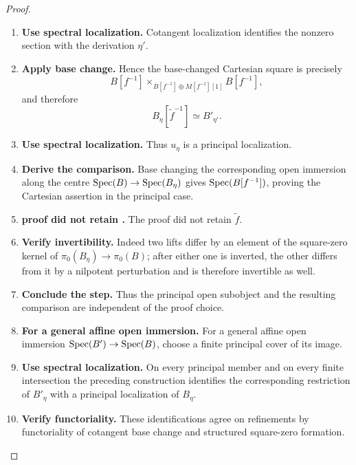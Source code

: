 \begin{proof}
\begin{enumerate}[label=\textup{(\arabic*)}]
    \item \textbf{Use spectral localization.}
    Cotangent localization identifies the nonzero section with the derivation \(\eta'\).

    \item \textbf{Apply base change.}
    Hence the base-changed Cartesian square is precisely
    \[
        B[f^{-1}]
        \times_{B[f^{-1}]\oplus M[f^{-1}][1]}
        B[f^{-1}],
    \]
    and therefore
    \[
        B_\eta[\widetilde f^{-1}]
        \simeq
        B'_{\eta'}.
    \]

    \item \textbf{Use spectral localization.}
    Thus \(u_\eta\) is a principal localization.

    \item \textbf{Derive the comparison.}
    Base changing the corresponding open immersion along the centre \(\operatorname{Spec}(B)\to\operatorname{Spec}(B_\eta)\) gives
    \(\operatorname{Spec}(B[f^{-1}])\), proving the Cartesian assertion in the principal case.

    \item \textbf{proof did not retain .}
    The proof did not retain \(\widetilde f\).

    \item \textbf{Verify invertibility.}
    Indeed two lifts differ by an element of the square-zero kernel of \(\pi_0(B_\eta)\to\pi_0(B)\); after either
    one is inverted, the other differs from it by a nilpotent perturbation and is therefore
    invertible as well.

    \item \textbf{Conclude the step.}
    Thus the principal open subobject and the resulting comparison are independent of the proof
    choice.

    \item \textbf{For a general affine open immersion.}
    For a general affine open immersion \(\operatorname{Spec}(B')\to\operatorname{Spec}(B)\), choose a finite principal cover of its
    image.

    \item \textbf{Use spectral localization.}
    On every principal member and on every finite intersection the preceding construction
    identifies the corresponding restriction of \(B'_\eta\) with a principal localization of
    \(B_\eta\).

    \item \textbf{Verify functoriality.}
    These identifications agree on refinements by functoriality of cotangent base change and
    structured square-zero formation.


\end{enumerate}
\end{proof}
